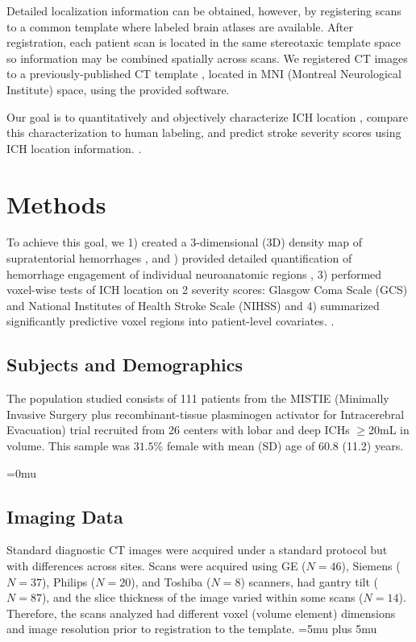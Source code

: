 Detailed localization information can be obtained, however, by registering scans to a common template where labeled brain atlases are available. After registration, each patient scan is located in the same stereotaxic template space so information may be combined spatially across scans. We registered CT images to a previously-published CT template \citep{rorden_age-specific_2012}, located in MNI (Montreal Neurological Institute) space, using the provided software. 

Our goal is to quantitatively and objectively characterize ICH location\ifseverity
, compare this characterization to human labeling, and predict stroke severity scores using ICH location information. 
\else
.
\fi


\section{Methods}

To achieve this goal, we 1) created a 3-dimensional (3D) density map of supratentorial hemorrhages\ifseverity
, 
\else
 and 
) provided detailed quantification of hemorrhage engagement of individual neuroanatomic regions\ifseverity
, 3) performed voxel-wise tests of ICH location on 2 severity scores: Glasgow Coma Scale (GCS) and National Institutes of Health Stroke Scale (NIHSS) and 4) summarized significantly predictive voxel regions into patient-level covariates.
\else 
.
\fi



\subsection{Subjects and Demographics}
The population studied consists of 111 patients from the MISTIE (Minimally Invasive Surgery plus recombinant-tissue plasminogen activator for Intracerebral Evacuation) \citep{morgan_preliminary_2008} trial recruited from 26 centers with lobar and deep ICHs $\geq$20mL in volume.    This sample was $31.5$\% female with mean (SD) age of 60.8 (11.2) years.



\thickmuskip=0mu

\subsection{Imaging Data}
Standard diagnostic CT images were acquired under a standard protocol but with differences across sites.  Scans were acquired using GE ($N{=}46$), Siemens ($N{=}37$), Philips ($N{=}20$), and Toshiba ($N{=}8$) scanners, had gantry tilt ($N{=}87$), and the slice thickness of the image varied within some scans ($N{=}14$). Therefore, the scans analyzed had different voxel (volume element) dimensions and image resolution prior to registration to the template. 
\thickmuskip=5mu plus 5mu


